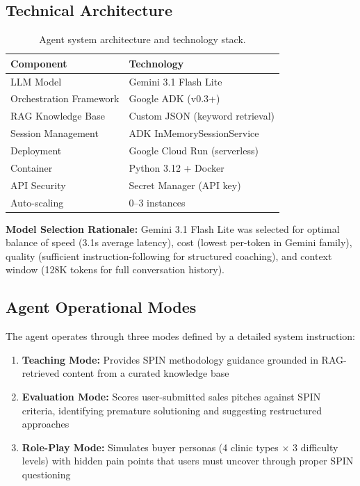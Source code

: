 \documentclass[11pt,a4paper]{article}
\begin{document}
\subsection{Technical Architecture}

\begin{table}[H]
\caption{Agent system architecture and technology stack.}
\setlength{\tabcolsep}{36pt}
\renewcommand{\arraystretch}{1.4}
\begin{tabular}{l l}
\toprule
\textbf{Component} & \textbf{Technology} \\
\midrule
LLM Model & Gemini 3.1 Flash Lite \\
Orchestration Framework & Google ADK (v0.3+) \\
RAG Knowledge Base & Custom JSON (keyword retrieval) \\
Session Management & ADK InMemorySessionService \\
Deployment & Google Cloud Run (serverless) \\
Container & Python 3.12 + Docker \\
API Security & Secret Manager (API key) \\
Auto-scaling & 0--3 instances \\
\bottomrule
\end{tabular}
\end{table}

\textbf{Model Selection Rationale:} Gemini 3.1 Flash Lite was selected for optimal balance of speed (3.1s average latency), cost (lowest per-token in Gemini family), quality (sufficient instruction-following for structured coaching), and context window (128K tokens for full conversation history).

\subsection{Agent Operational Modes}

The agent operates through three modes defined by a detailed system instruction:

\begin{enumerate}[leftmargin=*,noitemsep,topsep=2pt]
    \item \textbf{Teaching Mode:} Provides SPIN methodology guidance grounded in RAG-retrieved content from a curated knowledge base
    \item \textbf{Evaluation Mode:} Scores user-submitted sales pitches against SPIN criteria, identifying premature solutioning and suggesting restructured approaches
    \item \textbf{Role-Play Mode:} Simulates buyer personas (4 clinic types $\times$ 3 difficulty levels) with hidden pain points that users must uncover through proper SPIN questioning
\end{enumerate}
\end{document}
